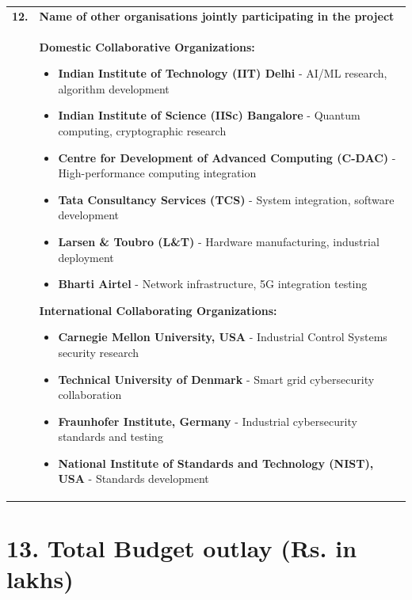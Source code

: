 \documentclass[12pt,a4paper]{article}
\begin{document}
\begin{longtable}{|p{0.5cm}p{3cm}|p{11cm}|}
\multicolumn{2}{|l|}{\textbf{12.}} & \textbf{Name of other organisations jointly participating in the project} \\
\multicolumn{2}{|l|}{} & 
\textbf{Domestic Collaborative Organizations:}
\begin{itemize}[leftmargin=1em, itemsep=0pt]
    \item \textbf{Indian Institute of Technology (IIT) Delhi} - AI/ML research, algorithm development
    \item \textbf{Indian Institute of Science (IISc) Bangalore} - Quantum computing, cryptographic research
    \item \textbf{Centre for Development of Advanced Computing (C-DAC)} - High-performance computing integration
    \item \textbf{Tata Consultancy Services (TCS)} - System integration, software development
    \item \textbf{Larsen \& Toubro (L\&T)} - Hardware manufacturing, industrial deployment
    \item \textbf{Bharti Airtel} - Network infrastructure, 5G integration testing
\end{itemize}

\textbf{International Collaborating Organizations:}
\begin{itemize}[leftmargin=1em, itemsep=0pt]
    \item \textbf{Carnegie Mellon University, USA} - Industrial Control Systems security research
    \item \textbf{Technical University of Denmark} - Smart grid cybersecurity collaboration
    \item \textbf{Fraunhofer Institute, Germany} - Industrial cybersecurity standards and testing
    \item \textbf{National Institute of Standards and Technology (NIST), USA} - Standards development
\end{itemize} \\
\hline

\end{longtable}

\newpage

\section*{13. Total Budget outlay (Rs. in lakhs)}
\end{document}
